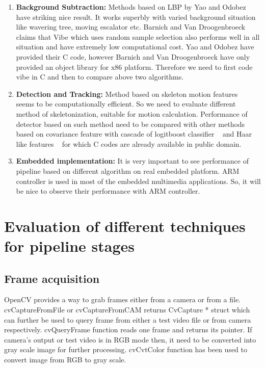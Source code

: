 \begin{enumerate}

 \item  \textbf{Background Subtraction:} Methods based on LBP by Yao and
Odobez ~\cite{11} have striking nice result. It works superbly with
varied background situation like wavering tree, moving escalator etc.
Barnich and Van Droogenbroeck claims that Vibe which uses random sample
selection also performs well in all situation and have extremely low
computational cost. Yao and Odobez have provided their C code, however
Barnich and Van Droogenbroeck have only provided an object library for
x86 platform. Therefore we need to first code vibe in C and then to
compare above two algorithms.

\item \textbf{Detection and Tracking:} Method based on skeleton motion
features ~\cite{32, 22, 31} seems to be computationally efficient. So we
need to evaluate different method of skeletonization, suitable for
motion calculation. Performance of detector based on such method need to
be compared with other methods based on covariance feature with cascade
of logitboost classifier ~\cite{19}  and Haar like features ~\cite{17}
for which C codes are already available in public domain.
 
\item \textbf{Embedded implementation:} It is very important to see
performance of pipeline based on different algorithm on real embedded
platform. ARM controller is used in most of the embedded multimedia
applications. So, it will be nice to observe their performance with ARM
controller.

\end{enumerate}


\section {Evaluation of different techniques for pipeline stages}

\subsection{Frame acquisition}

\indent OpenCV provides a way to grab frames either from a camera or
from a file. cvCaptureFromFile or cvCaptureFromCAM returns CvCapture *
struct which can further be used to query frame from either a test video
file or from camera respectively. cvQueryFrame function reads one frame
and returns its pointer. If camera's output or test video is in RGB mode
then, it need to be converted into gray scale image for further
processing. cvCvtColor function has been used to convert image from RGB
to gray scale.


